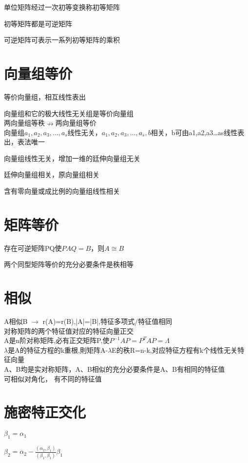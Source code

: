 \documentclass[UTF8]{ctexart}
\begin{document}
单位矩阵经过一次初等变换称初等矩阵

初等矩阵都是可逆矩阵

可逆矩阵可表示一系列初等矩阵的乘积

\section{向量组等价}

等价向量组，相互线性表出

向量组和它的极大线性无关组是等价向量组 \\
两向量组等秩$\nrightarrow $两向量组等价  \\
向量组$a_{1},a_{2},a_{3},\ldots,a_{s}$线性无关，$a_{1},a_{2},a_{3},\ldots,a_{s},b$相关，b可由a1,a2,a3…as线性表出，表法唯一

向量组线性无关，增加一维的廷伸向量组无关

廷伸向量组相关，原向量组相关

含有零向量或成比例的向量组线性相关

\section{矩阵等价}

存在可逆矩阵PQ使$PAQ=B$，则$A\cong B$

两个同型矩阵等价的充分必要条件是秩相等

\section{相似}

A相似B $\rightarrow$  r(A)=r(B),|A|=|B|,特征多项式/特征值相同 \\
对称矩阵的两个特征值对应的特征向量正交 \\
A是n阶对称矩阵,必有正交矩阵P,使$P^{-1}AP=P^TAP=\varLambda$ \\
$\lambda$是A的特征方程的k重根,則矩阵A-$\lambda$E的秩R=n-k,对应特征方程有k个线性无关特征向量 \\
A、B均是实对称矩阵，A、B相似的充分必要条件是A、B有相同的特征值 \\
可相似对角化，  有不同的特征值 \\


\section{施密特正交化}

$\beta_{1}=\alpha_{1}$

$\beta_{2}=\alpha_{2}-\frac{(\alpha_{2},\beta_{1})}{(\beta_{1},\beta_{1})}\beta_{1}$
\end{document}
